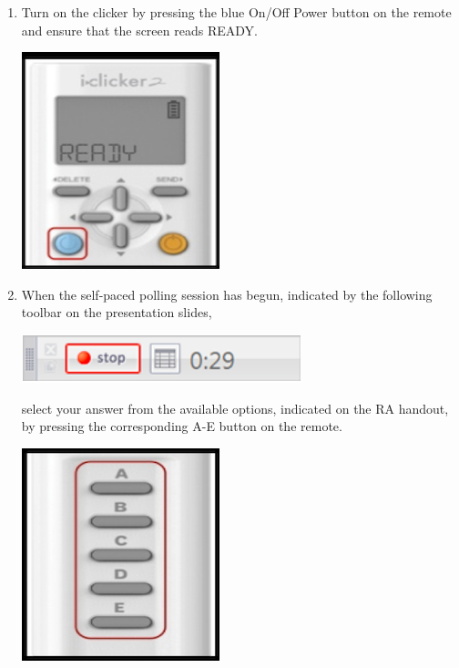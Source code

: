 \documentclass[12pt]{article}
\begin{document}
\begin{enumerate}

\item Turn on the clicker by pressing the blue On/Off Power button on the remote and ensure that the screen reads READY.

\begin{center}
\includegraphics{clicker_images/clicker_ready.png}
\end{center}

\item When the self-paced polling session has begun, indicated by the following toolbar on the presentation slides,

\begin{center}
\includegraphics{clicker_images/self_polling.png}
\end{center}

select your answer from the available options, indicated on the RA handout, by pressing the corresponding A-E button on the remote.

\begin{center}
\includegraphics{clicker_images/buttons.png}
\end{center}


\end{enumerate}
\end{document}

